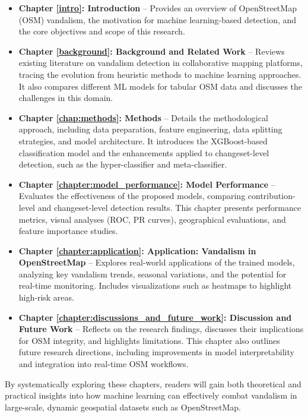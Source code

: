 \documentclass[
    13pt, %
    a4paper, %
    listof=totoc, %
    bibliography=totoc, %
    index=totoc, %
    headsepline
]{scrreprt}
\begin{document}
\begin{itemize}
  \item \textbf{Chapter \ref{intro}: Introduction} – Provides an overview of OpenStreetMap (OSM) vandalism, the motivation for machine learning-based detection, and the core objectives and scope of this research.

  \item \textbf{Chapter \ref{background}: Background and Related Work} – Reviews existing literature on vandalism detection in collaborative mapping platforms, tracing the evolution from heuristic methods to machine learning approaches. It also compares different ML models for tabular OSM data and discusses the challenges in this domain.

  \item \textbf{Chapter \ref{chap:methods}: Methods} – Details the methodological approach, including data preparation, feature engineering, data splitting strategies, and model architecture. It introduces the XGBoost-based classification model and the enhancements applied to changeset-level detection, such as the hyper-classifier and meta-classifier.

  \item \textbf{Chapter \ref{chapter:model_performance}: Model Performance} – Evaluates the effectiveness of the proposed models, comparing contribution-level and changeset-level detection results. This chapter presents performance metrics, visual analyses (ROC, PR curves), geographical evaluations, and feature importance studies.

  \item \textbf{Chapter \ref{chapter:application}: Application: Vandalism in OpenStreetMap} – Explores real-world applications of the trained models, analyzing key vandalism trends, seasonal variations, and the potential for real-time monitoring. Includes visualizations such as heatmaps to highlight high-risk areas.

  \item \textbf{Chapter \ref{chapter:discussions_and_future_work}: Discussion and Future Work} – Reflects on the research findings, discusses their implications for OSM integrity, and highlights limitations. This chapter also outlines future research directions, including improvements in model interpretability and integration into real-time OSM workflows.

\end{itemize}

By systematically exploring these chapters, readers will gain both theoretical and practical insights into how machine learning can effectively combat vandalism in large-scale, dynamic geospatial datasets such as OpenStreetMap.
\end{document}
